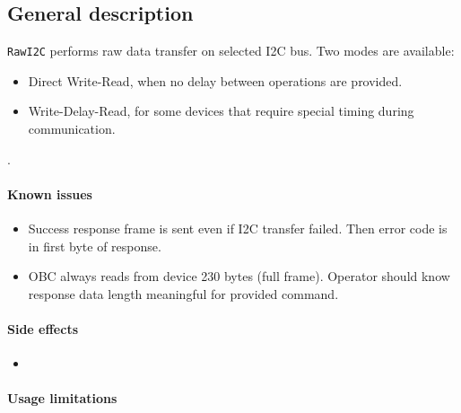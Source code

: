 

\subsection{General description}



\texttt{RawI2C} performs raw data transfer on selected I2C bus.
Two modes are available:
\begin{itemize}
	\item Direct Write-Read, when no delay between operations are provided.
	\item Write-Delay-Read, for some devices that require special timing during communication. 
\end{itemize}
.

\paragraph{Known issues}
\begin{itemize}
	\item Success response frame is sent even if I2C transfer failed. Then error code is in first byte of response.
	\item OBC always reads from device 230 bytes (full frame). Operator should know response data length meaningful for provided command.
\end{itemize}

\paragraph{Side effects}
\begin{itemize}
	\item {}
\end{itemize}

\paragraph{Usage limitations}\mbox{}\\ 
\None

